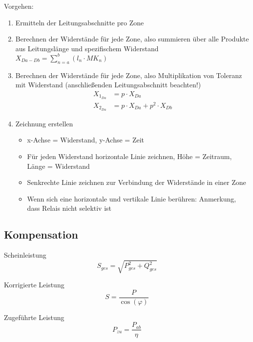\documentclass[11pt, a4paper, final, fleqn, twocolumn]{article}
\numberwithin{equation}{subsection}
\begin{document}
Vorgehen:
\begin{enumerate}
    \item Ermitteln der Leitungsabschnitte pro Zone
    \item Berechnen der Widerstände für jede Zone, also summieren über alle Produkte aus Leitungslänge und spezifischem Widerstand \\ \(X_{Da-Db} = \sum_{n=a}^{b} (l_n \cdot MK_n) \)
    \item Berechnen der Widerstände für jede Zone, also Multiplikation von Toleranz mit Widerstand (anschließenden Leitungsabschnitt beachten!) \\
    \begin{equation}
    \begin{split}
        X_{1_{Da}} & = p \cdot X_{Da} \\
        X_{2_{Da}} & = p \cdot X_{Da} + p^2 \cdot X_{Db}
    \end{split}
    \end{equation}
    \item Zeichnung erstellen
    \begin{itemize}
        \item x-Achse = Widerstand, y-Achse = Zeit
        \item Für jeden Widerstand horizontale Linie zeichnen, Höhe = Zeitraum, Länge = Widerstand
        \item Senkrechte Linie zeichnen zur Verbindung der Widerstände in einer Zone
        \item Wenn sich eine horizontale und vertikale Linie berühren: Anmerkung, dass Relais nicht selektiv ist
    \end{itemize}
\end{enumerate}


\subsection{Kompensation}

Scheinleistung
\begin{equation}
    S_{ges} = \sqrt{P_{ges}^2 +Q_{ges}^2}
\end{equation}

\noindent Korrigierte Leistung
\begin{equation}
    S = \frac{P}{\cos(\varphi)}
\end{equation}

\noindent Zugeführte Leistung
\begin{equation}
    P_{zu} = \frac{P_{ab}}{\eta}
\end{equation}
\end{document}
